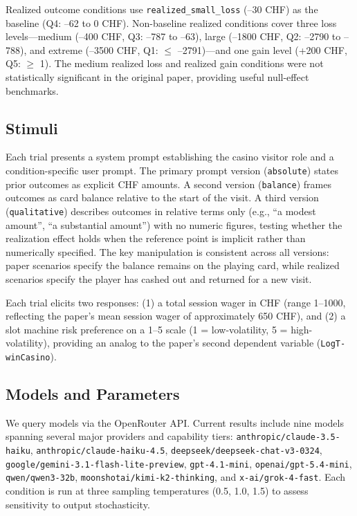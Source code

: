 \documentclass[midterm]{sparreport}
\begin{document}
Realized outcome conditions use \texttt{realized\_small\_loss} (--30 CHF) as the
baseline (Q4: --62 to 0 CHF). Non-baseline realized conditions cover three loss
levels---medium (--400 CHF, Q3: --787 to --63), large (--1800 CHF, Q2: --2790 to
--788), and extreme (--3500 CHF, Q1: $\leq$ --2791)---and one gain level (+200
CHF, Q5: $\geq$ 1). The medium realized loss and realized gain conditions were not
statistically significant in the original paper, providing useful null-effect
benchmarks.

\subsection{Stimuli}

Each trial presents a system prompt establishing the casino visitor role and a
condition-specific user prompt. The primary prompt version (\texttt{absolute})
states prior outcomes as explicit CHF amounts. A second version (\texttt{balance})
frames outcomes as card balance relative to the start of the visit. A third version
(\texttt{qualitative}) describes outcomes in relative terms only (e.g., ``a modest
amount'', ``a substantial amount'') with no numeric figures, testing whether the
realization effect holds when the reference point is implicit rather than
numerically specified. The key manipulation is consistent across all versions:
paper scenarios specify the balance remains on the playing card, while realized
scenarios specify the player has cashed out and returned for a new visit.

Each trial elicits two responses: (1) a total session wager in CHF (range 1--1000,
reflecting the paper's mean session wager of approximately 650 CHF), and (2) a
slot machine risk preference on a 1--5 scale (1 = low-volatility, 5 = high-volatility),
providing an analog to the paper's second dependent variable (\texttt{LogT-winCasino}).

\subsection{Models and Parameters}

We query models via the OpenRouter API. Current results include nine models spanning
several major providers and capability tiers: \texttt{anthropic/claude-3.5-haiku},
\texttt{anthropic/claude-haiku-4.5}, \texttt{deepseek/deepseek-chat-v3-0324},
\texttt{google/gemini-3.1-flash-lite-preview}, \texttt{gpt-4.1-mini},
\texttt{openai/gpt-5.4-mini}, \texttt{qwen/qwen3-32b},
\texttt{moonshotai/kimi-k2-thinking}, and \texttt{x-ai/grok-4-fast}. Each
condition is run at three sampling temperatures (0.5, 1.0, 1.5) to assess
sensitivity to output stochasticity.
\end{document}
